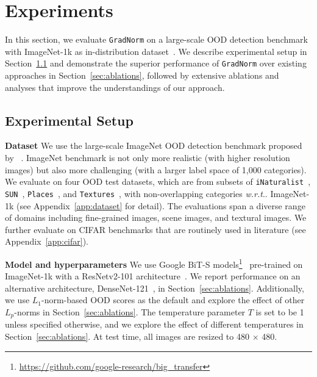 \documentclass{article}
\makeatletter
\DeclareRobustCommand\onedot{\futurelet\@let@token\@onedot}
\def\@onedot{\ifx\@let@token.\else.\null\fi\xspace}
\def\wrt{\emph{w.r.t}\onedot} \def\dof{d.o.f\onedot}
\makeatother
\begin{document}
\vspace{-0.3cm}

\section{Experiments}
\label{sec:experiments}
\vspace{-0.3cm}
In this section, we evaluate \texttt{GradNorm} on a large-scale OOD detection benchmark with ImageNet-1k as in-distribution dataset~\cite{huang2021mos}. We describe experimental setup in Section~\ref{sec:exp_setup} and demonstrate the superior performance of \texttt{GradNorm} over existing approaches in Section~\ref{sec:ablations}, followed by extensive ablations and analyses that improve the understandings of our approach. 

\vspace{-0.2cm}
\subsection{Experimental Setup}
\label{sec:exp_setup}
\vspace{-0.2cm}
\textbf{Dataset} 
We use the large-scale ImageNet OOD detection benchmark proposed by \citeauthor{huang2021mos}~\cite{huang2021mos}.
ImageNet benchmark is not only more realistic (with higher resolution images) but also more challenging (with a larger label space of 1,000 categories). 
We evaluate on four OOD test datasets, which are from subsets of \texttt{iNaturalist}~\cite{van2018inaturalist}, \texttt{SUN}~\cite{xiao2010sun}, \texttt{Places}~\cite{zhou2017places}, and \texttt{Textures}~\cite{cimpoi2014describing}, with non-overlapping categories \wrt ImageNet-1k (see Appendix~\ref{app:dataset} for detail). The evaluations span a diverse range of domains including fine-grained images, scene images, and textural images. We further evaluate on CIFAR benchmarks that are routinely used in literature (see Appendix~\ref{app:cifar}).






\textbf{Model and hyperparameters} 
We use Google BiT-S models\footnote{\url{https://github.com/google-research/big_transfer}}~\cite{kolesnikov2020big} pre-trained on ImageNet-1k with a ResNetv2-101 architecture~\cite{he2016identity}. We report performance on an alternative architecture, DenseNet-121~\cite{huang2017densely}, in Section~\ref{sec:ablations}. Additionally, we use $L_1$-norm-based OOD scores as the default and explore the effect of other $L_p$-norms in Section~\ref{sec:ablations}. The temperature parameter $T$ is set to be 1 unless specified otherwise, and we explore the effect of different temperatures in Section~\ref{sec:ablations}. At test time, all images are resized to 480 $\times$ 480.
\end{document}

